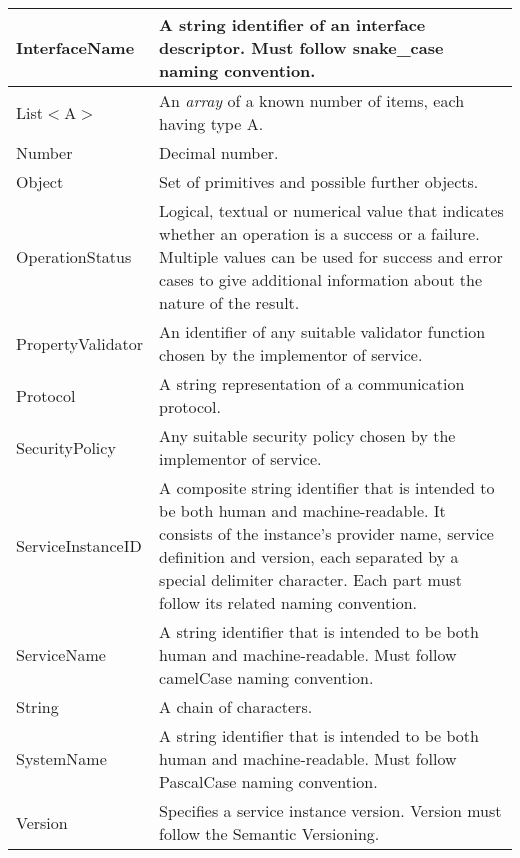 \documentclass[a4paper]{arrowhead}
\newcommand{\pdef}[1]{{\textcolor{ArrowheadGrey}{#1\label{sec:model:primitives:#1}\label{sec:model:primitives:#1s}\label{sec:model:primitives:#1es}}}}
\begin{document}
\begin{table}[ht!]
\begin{tabularx}{\textwidth}{| p{3cm} | X |} \hline
\pdef{InterfaceName}    & A string identifier of an interface descriptor. Must follow snake\_case naming convention. \\ \hline
\pdef{List}$<$A$>$      & An \textit{array} of a known number of items, each having type A. \\ \hline
\pdef{Number}           & Decimal number. \\ \hline
\pdef{Object}           & Set of primitives and possible further objects. \\ \hline
\pdef{OperationStatus}  & Logical, textual or numerical value that indicates whether an operation is a success or a failure. Multiple values can be used for success and error cases to give additional information about the nature of the result. \\ \hline
\pdef{PropertyValidator} & An identifier of any suitable validator function chosen by the implementor of service. \\ \hline
\pdef{Protocol}         & A string representation of a communication protocol. \\ \hline
\pdef{SecurityPolicy}   & Any suitable security policy chosen by the implementor of service. \\ \hline
\pdef{ServiceInstanceID} & A composite string identifier that is intended to be both human and machine-readable. It consists of the instance's provider name, service definition and version, each separated by a special delimiter character. Each part must follow its related naming convention. \\ \hline
\pdef{ServiceName}      & A string identifier that is intended to be both human and machine-readable. Must follow camelCase naming convention. \\ \hline
\pdef{String}           & A chain of characters. \\ \hline
\pdef{SystemName}       & A string identifier that is intended to be both human and machine-readable. Must follow PascalCase naming convention. \\ \hline
\pdef{Version}          & Specifies a service instance version. Version must follow the Semantic Versioning. \\ \hline
\end{tabularx}
\end{table}

\newpage



\end{document}
